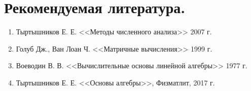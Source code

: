 \newpage
\section{Рекомендуемая литература.}

\begin{enumerate}
    \item Тыртышников Е. Е. <<Методы численного анализа>> 2007 г.
    \item Голуб Дж., Ван Лоан Ч. <<Матричные вычисления>> 1999 г.
    \item Воеводин В. В. <<Вычислительные основы линейной алгебры>> 1977 г. 
    \item Тыртышников Е. Е. <<Основы алгебры>>, Физматлит, 2017 г.
\end{enumerate}
